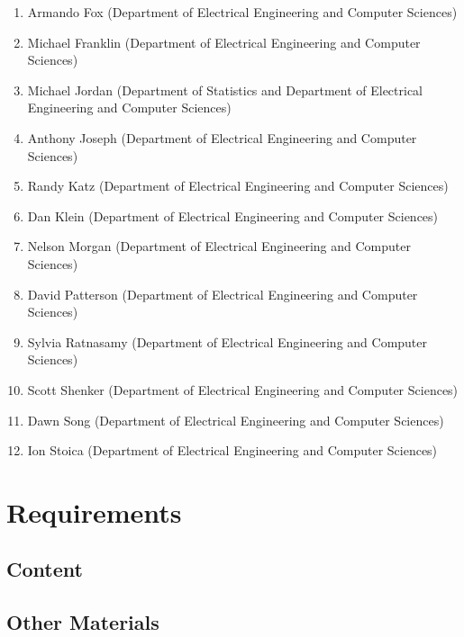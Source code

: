 \documentclass [10pt]{article}
\begin{document}
\begin{outline}
\begin{enumerate}
\item Armando Fox (Department of Electrical Engineering and Computer Sciences)

\item Michael Franklin (Department of Electrical Engineering and Computer Sciences)
\item Michael Jordan (Department of Statistics and Department of Electrical Engineering and Computer Sciences)

\item Anthony Joseph (Department of Electrical Engineering and Computer Sciences)


\item Randy Katz (Department of Electrical Engineering and Computer Sciences)


\item Dan Klein  (Department of Electrical Engineering and Computer Sciences)

\item Nelson Morgan  (Department of Electrical Engineering and Computer Sciences)


\item David Patterson (Department of Electrical Engineering and Computer Sciences)

\item Sylvia Ratnasamy  (Department of Electrical Engineering and Computer Sciences)


\item Scott Shenker (Department of Electrical Engineering and Computer Sciences)

\item Dawn Song (Department of Electrical Engineering and Computer Sciences)


\item Ion Stoica (Department of Electrical Engineering and Computer Sciences)


\end{enumerate}


\newpage

\section*{Requirements}

\subsection*{Content}

\subsection*{Other Materials}


\end{outline}
\end{document}
